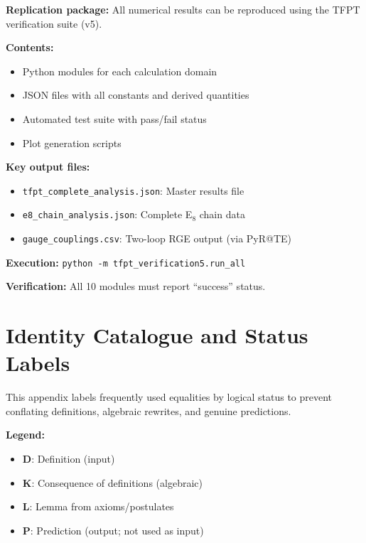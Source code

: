 \textbf{Replication package:} All numerical results can be reproduced using the 
TFPT verification suite (v5).

\textbf{Contents:}
\begin{itemize}[leftmargin=1.5em, topsep=2pt, itemsep=1pt]
    \item Python modules for each calculation domain
    \item JSON files with all constants and derived quantities
    \item Automated test suite with pass/fail status
    \item Plot generation scripts
\end{itemize}

\textbf{Key output files:}
\begin{itemize}[leftmargin=1.5em, topsep=2pt, itemsep=1pt]
    \item \texttt{tfpt\_complete\_analysis.json}: Master results file
    \item \texttt{e8\_chain\_analysis.json}: Complete E$_8$ chain data
    \item \texttt{gauge\_couplings.csv}: Two-loop RGE output (via PyR@TE)
\end{itemize}

\textbf{Execution:} \texttt{python -m tfpt\_verification5.run\_all}

\textbf{Verification:} All 10 modules must report ``success'' status.

\section{Identity Catalogue and Status Labels}
\label{app:identities}

This appendix labels frequently used equalities by logical status to prevent conflating definitions, algebraic rewrites, and genuine predictions.

\textbf{Legend:}
\begin{itemize}[leftmargin=1.5em, topsep=2pt, itemsep=1pt]
    \item \textbf{D}: Definition (input)
    \item \textbf{K}: Consequence of definitions (algebraic)
    \item \textbf{L}: Lemma from axioms/postulates
    \item \textbf{P}: Prediction (output; not used as input)
\end{itemize}

